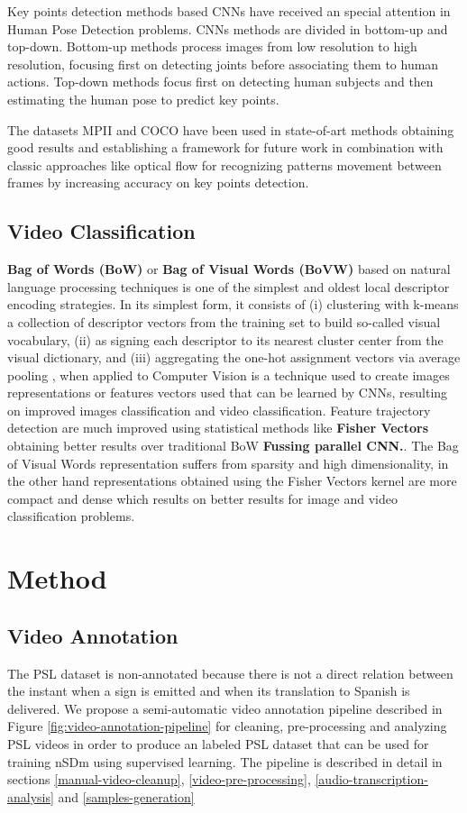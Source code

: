 \documentclass[twocolumn,conference]{article}
\begin{document}
Key points detection methods based CNNs have received an special attention in Human Pose Detection problems. CNNs methods are divided in bottom-up and top-down. Bottom-up methods process images from low resolution  to high resolution, focusing first on detecting joints before associating them to human actions. Top-down methods focus first on detecting human subjects and then estimating the human pose to predict key points. 

The datasets MPII and COCO have been used in state-of-art methods obtaining good results\cite{XiaoWuWeiSimpleBaseline} and establishing a framework for future work in combination with classic approaches like optical flow for recognizing patterns movement between frames by increasing accuracy on key points detection.
\subsection{Video Classification}
\textbf{Bag of Words (BoW)} or \textbf{Bag of Visual Words (BoVW)} based on natural language processing techniques is one of the simplest and oldest local descriptor encoding strategies. In its simplest form, it consists of (i) clustering with k-means a collection of descriptor vectors from the training set to build so-called visual vocabulary, (ii) as signing each descriptor to its nearest cluster center from the visual dictionary, and (iii) aggregating the one-hot assignment vectors via average pooling \cite{wang2019hallucinating}, when applied to Computer Vision is a technique used to create images representations or features vectors used that can be learned by CNNs, resulting on improved images classification and video classification. 
Feature trajectory detection are much improved using statistical methods like \textbf{Fisher Vectors} obtaining better results over traditional BoW \textbf{Fussing parallel CNN.}. The Bag of Visual Words representation suffers from sparsity and high dimensionality, in the other hand representations obtained using the Fisher Vectors kernel are more compact and dense which results on better results for image and video classification problems.
\section{Method}\label{method}
\subsection{Video Annotation}\label{videoannot}
The PSL dataset is non-annotated because there is not a direct relation between the instant when a sign is emitted and when its translation to Spanish is delivered. We propose a semi-automatic video annotation pipeline described in Figure \ref{fig:video-annotation-pipeline} for cleaning, pre-processing and analyzing PSL videos in order to produce an labeled PSL dataset that can be used for training nSDm using supervised learning. The pipeline is described in detail in sections  \ref{manual-video-cleanup}, \ref{video-pre-processing}, \ref{audio-transcription-analysis} and \ref{samples-generation}
\end{document}
